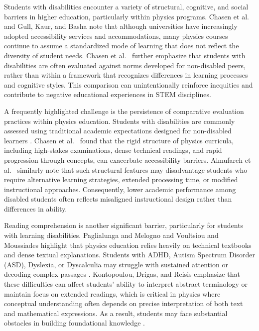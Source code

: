\documentclass[]{aastex701}
\begin{document}
Students with disabilities encounter a variety of structural, cognitive, and social barriers in higher education, particularly within physics programs. Chasen et al.\ \citep{Chasen2025} and Gull, Kaur, and Basha \citep{Gull2025} note that although universities have increasingly adopted accessibility services and accommodations, many physics courses continue to assume a standardized mode of learning that does not reflect the diversity of student needs. Chasen et al.\ \citep{Chasen2025} further emphasize that students with disabilities are often evaluated against norms developed for non-disabled peers, rather than within a framework that recognizes differences in learning processes and cognitive styles. This comparison can unintentionally reinforce inequities and contribute to negative educational experiences in STEM disciplines.

A frequently highlighted challenge is the persistence of comparative evaluation practices within physics education. Students with disabilities are commonly assessed using traditional academic expectations designed for non-disabled learners \citep{Chasen2025, AlAzawei2023}. Chasen et al.\ \citep{Chasen2025} found that the rigid structure of physics curricula, including high-stakes examinations, dense technical readings, and rapid progression through concepts, can exacerbate accessibility barriers. Almufareh et al.\ \citep{Almufareh2025} similarly note that such structural features may disadvantage students who require alternative learning strategies, extended processing time, or modified instructional approaches. Consequently, lower academic performance among disabled students often reflects misaligned instructional design rather than differences in ability.

Reading comprehension is another significant barrier, particularly for students with learning disabilities. Paglialunga and Melogno \citep{Paglialunga2025} and Voultsiou and Moussiades \citep{Voultsiou2025} highlight that physics education relies heavily on technical textbooks and dense textual explanations. Students with ADHD, Autism Spectrum Disorder (ASD), Dyslexia, or Dyscalculia may struggle with sustained attention or decoding complex passages \citep{Paglialunga2025, Voultsiou2025, HarkinsBrown2025}. Kontopoulou, Drigas, and Reisis \citep{Kontopoulou2024} emphasize that these difficulties can affect students' ability to interpret abstract terminology or maintain focus on extended readings, which is critical in physics where conceptual understanding often depends on precise interpretation of both text and mathematical expressions. As a result, students may face substantial obstacles in building foundational knowledge \citep{Paglialunga2025, Sweller2011}.
\end{document}
